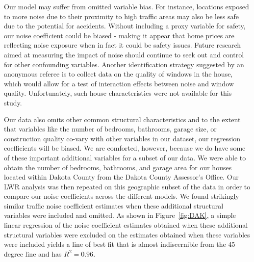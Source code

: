 \documentclass{article}\usepackage[]{graphicx}\usepackage[]{color}
\begin{document}
Our model may suffer from omitted variable bias. For instance, locations exposed to more noise due to their proximity to high traffic areas may also be less safe due to the potential for accidents. Without including a proxy variable for safety, our noise coefficient could be biased - making it appear that home prices are reflecting noise exposure when in fact it could be safety issues. Future research aimed at measuring the impact of noise should continue to seek out and control for other confounding variables. Another identification strategy suggested by an anonymous referee is to collect data on the quality of windows in the house, which would allow for a test of interaction effects between noise and window quality. Unfortunately, such house characteristics were not available for this study.

Our data also omits other common structural characteristics and to the extent that variables like the number of bedrooms, bathrooms, garage size, or construction quality co-vary with other variables in our dataset, our regression coefficients will be biased. We are comforted, however, because we do have some of these important additional variables for a subset of our data. We were able to obtain the number of bedrooms, bathrooms, and garage area for our houses located within Dakota County from the Dakota County Assessor's Office. Our LWR analysis was then repeated on this geographic subset of the data in order to compare our noise coefficients across the different models. We found strikingly similar traffic noise coefficient estimates when these additional structural variables were included and omitted. As shown in Figure~\ref{fig:DAK}, a simple linear regression of the noise coefficient estimates obtained when these additional structural variables were excluded on the estimates obtained when these variables were included yields a line of best fit that is almost indiscernible from the 45 degree line and has $R^2 = 0.96$. 
\end{document}
